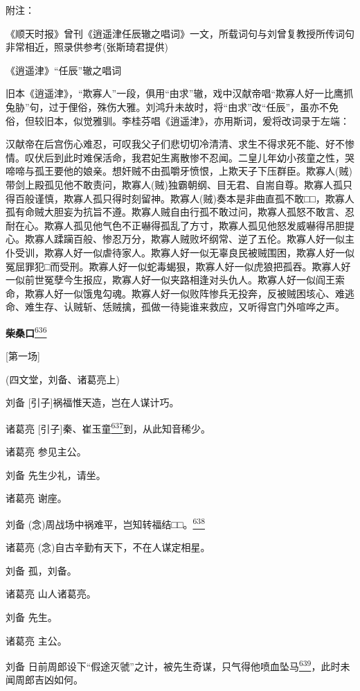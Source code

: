 附注：

《顺天时报》曾刊《逍遥津任辰辙之唱词》一文，所载词句与刘曾复教授所传词句非常相近，照录供参考(张斯琦君提供)

《逍遥津》``任辰''辙之唱词

旧本《逍遥津》，``欺寡人''一段，俱用``由求''辙，戏中汉献帝唱``欺寡人好一比鹰抓兔胁''句，过于俚俗，殊伤大雅。刘鸿升未故时，将``由求''改``任辰''，虽亦不免俗，但较旧本，似觉雅驯。李桂芬唱《逍遥津》，亦用斯词，爰将改词录于左端：

汉献帝在后宫伤心难忍，可叹我父子们悲切切冷清清、求生不得求死不能、好不惨情。叹伏后到此时难保活命，我君妃生离散惨不忍闻。二皇儿年幼小孩童之性，哭啼啼与孤王要他的娘亲。想奸贼不由孤嚼牙愤恨，上欺天子下压群臣。欺寡人(贼)带剑上殿孤见他不敢责问，欺寡人(贼)独霸朝纲、目无君、自耑自尊。欺寡人孤只得百般谨慎，欺寡人孤只得时刻留神。欺寡人(贼)奏本是非曲直孤不敢□□，欺寡人孤有命贼大胆妄为抗旨不遵。欺寡人贼自由行孤不敢过问，欺寡人孤怒不敢言、忍耐在心。欺寡人孤见他气色不正嚇得孤乱了方寸，欺寡人孤见他怒发威嚇得吊胆提心。欺寡人蹂躏百般、惨忍万分，欺寡人贼败坏纲常、逆了五伦。欺寡人好一似主仆受训，欺寡人好一似虐待家人。欺寡人好一似无辜良民被贼围困，欺寡人好一似冤屈罪犯□而受刑。欺寡人好一似蛇毒蝎狠，欺寡人好一似虎狼把孤吞。欺寡人好一似前世冤孽今生报应，欺寡人好一似夹路相逢对头仇人。欺寡人好一似阎王索命，欺寡人好一似饿鬼勾魂。欺寡人好一似败阵惨兵无投奔，反被贼困垓心、难逃命、难生存、认贼斩、恁贼擒，孤做一待毙谁来救应，又听得宫门外喧哗之声。

\textbf{柴桑口}\protect\hyperlink{fn636}{\textsuperscript{636}}

{[}第一场{]}

(四文堂，刘备、诸葛亮上)

刘备 {[}引子{]}祸福惟天造，岂在人谋计巧。

诸葛亮
{[}引子{]}秦、崔玉童\protect\hyperlink{fn637}{\textsuperscript{637}}到，从此知音稀少。

诸葛亮 参见主公。

刘备 先生少礼，请坐。

诸葛亮 谢座。

刘备
(念)周战场中祸难平，岂知转福结□□。\protect\hyperlink{fn638}{\textsuperscript{638}}

诸葛亮 (念)自古辛勤有天下，不在人谋定相星。

刘备 孤，刘备。

诸葛亮 山人诸葛亮。

刘备 先生。

诸葛亮 主公。

刘备
日前周郎设下``假途灭虢''之计，被先生奇谋，只气得他喷血坠马\protect\hyperlink{fn639}{\textsuperscript{639}}，此时未闻周郎吉凶如何。

